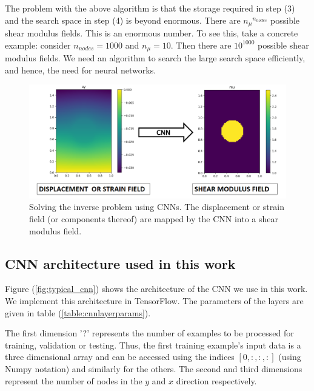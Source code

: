 \documentclass[12pt]{article}
\begin{document}
The problem with the above algorithm is that the storage required in step (3) and the search space in step (4) is beyond enormous. There are ${n_{\mu}}^{n_{nodes}}$ possible shear modulus fields. This is an enormous number. To see this, take a concrete example: consider $n_{nodes}=1000$ and $n_{\mu}=10$. Then there are $10^{1000}$ possible shear modulus fields. We need an algorithm to search the large search space efficiently, and hence, the need for neural networks.
%
\begin{figure}[!h]
   \centering
    \includegraphics[totalheight=5cm]{Figures/schematic_inv/schematic_inv.png}
  \caption{\label{fig:schematic_inv} Solving the inverse problem using CNNs. The displacement or strain field (or components thereof) are mapped by the CNN into a shear modulus field.}
\end{figure}
%
\subsection{\label{sect:cnnarch} CNN architecture used in this work}
Figure (\ref{fig:typical_cnn}) shows the architecture of the CNN we use in this work. We implement this architecture in TensorFlow. The parameters of the layers are given in table (\ref{table:cnnlayerparams}).

The first dimension '?' represents the number of examples to be processed for training, validation or testing. Thus, the first training example's input data is a three dimensional array and can be accessed using the indices $[0,:,:,:]$ (using Numpy \cite{paper:numpy} notation) and similarly for the others. The second and third dimensions represent the number of nodes in the $y$ and $x$ direction respectively.
\end{document}
